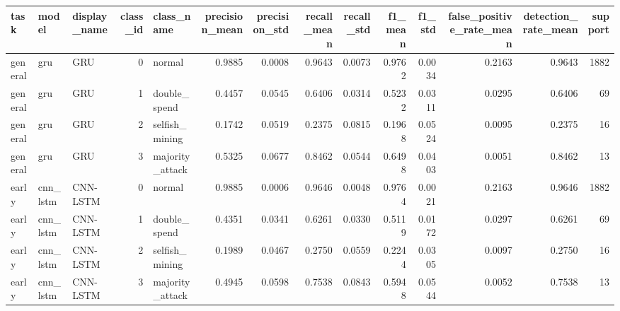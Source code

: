 \begin{tabular}{lllrlrrrrrrrrr}
\toprule
task & model & display\_name & class\_id & class\_name & precision\_mean & precision\_std & recall\_mean & recall\_std & f1\_mean & f1\_std & false\_positive\_rate\_mean & detection\_rate\_mean & support \\
\midrule
general & gru & GRU & 0 & normal & 0.9885 & 0.0008 & 0.9643 & 0.0073 & 0.9762 & 0.0034 & 0.2163 & 0.9643 & 1882 \\
general & gru & GRU & 1 & double\_spend & 0.4457 & 0.0545 & 0.6406 & 0.0314 & 0.5232 & 0.0311 & 0.0295 & 0.6406 & 69 \\
general & gru & GRU & 2 & selfish\_mining & 0.1742 & 0.0519 & 0.2375 & 0.0815 & 0.1968 & 0.0524 & 0.0095 & 0.2375 & 16 \\
general & gru & GRU & 3 & majority\_attack & 0.5325 & 0.0677 & 0.8462 & 0.0544 & 0.6498 & 0.0403 & 0.0051 & 0.8462 & 13 \\
early & cnn\_lstm & CNN-LSTM & 0 & normal & 0.9885 & 0.0006 & 0.9646 & 0.0048 & 0.9764 & 0.0021 & 0.2163 & 0.9646 & 1882 \\
early & cnn\_lstm & CNN-LSTM & 1 & double\_spend & 0.4351 & 0.0341 & 0.6261 & 0.0330 & 0.5119 & 0.0172 & 0.0297 & 0.6261 & 69 \\
early & cnn\_lstm & CNN-LSTM & 2 & selfish\_mining & 0.1989 & 0.0467 & 0.2750 & 0.0559 & 0.2244 & 0.0305 & 0.0097 & 0.2750 & 16 \\
early & cnn\_lstm & CNN-LSTM & 3 & majority\_attack & 0.4945 & 0.0598 & 0.7538 & 0.0843 & 0.5948 & 0.0544 & 0.0052 & 0.7538 & 13 \\
\bottomrule
\end{tabular}
